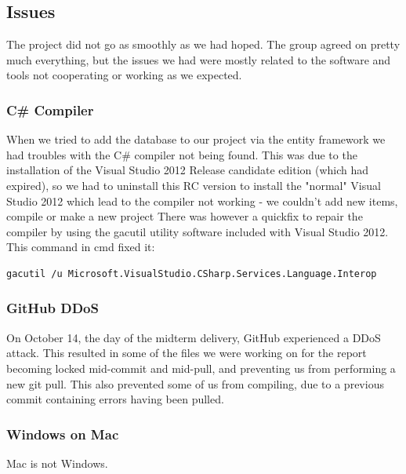 \subsection{Issues}
The project did not go as smoothly as we had hoped. The group agreed on pretty much everything, but the issues we had were mostly related to the software and tools not cooperating or working as we expected.

\subsubsection{C\# Compiler}
When we tried to add the database to our project via the entity framework we had troubles with the C\# compiler not being found. This was due to the installation of the Visual Studio 2012 Release candidate edition (which had expired), so we had to uninstall this RC version to install the "normal" Visual Studio 2012 which lead to the compiler not working - we couldn't add new items, compile or make a new project
There was however a quickfix to repair the compiler by using the gacutil utility software included with Visual Studio 2012.
This command in cmd fixed it:
\begin{verbatim}
gacutil /u Microsoft.VisualStudio.CSharp.Services.Language.Interop 
\end{verbatim}

\subsubsection{GitHub DDoS}
On October 14, the day of the midterm delivery, GitHub experienced a DDoS attack. This resulted in some of the files we were working on for the report becoming locked mid-commit and mid-pull, and preventing us from performing a new git pull. This also prevented some of us from compiling, due to a previous commit containing errors having been pulled.

\subsubsection{Windows on Mac}
Mac is not Windows. %

